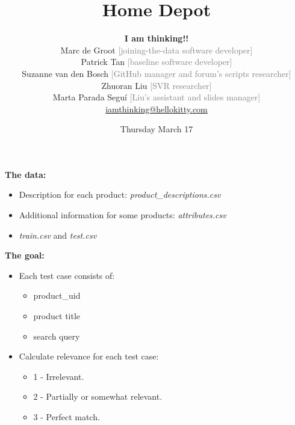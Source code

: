 \documentclass[10pt,handout]{beamer}
\title{Home Depot}
\author[]{\textbf{ \large I am thinking!!}\\ \vspace*{0.25cm} Marc de Groot \textcolor{grey}{\small [joining-the-data software developer]}\\ \vspace*{0.1cm}Patrick Tan \textcolor{grey}{\small[baseline software developer]}\\ \vspace*{0.1cm}Suzanne van den Bosch \textcolor{grey}{\small[GitHub manager and forum's scripts researcher]}\\ \vspace*{0.1cm}Zhuoran Liu \textcolor{grey}{\small[SVR researcher]}\\ \vspace*{0.1cm}Marta Parada Seguí \textcolor{grey}{\small[Liu's assistant and slides manager]}\\ \vspace*{0.65cm} \href{mailto:iamthinking@hellokitty.com}{iamthinking@hellokitty.com}}
\date{Thursday March 17}
\begin{document}
	\renewcommand{\approx}{\simeq}
	\renewcommand{\oplus}{\bigoplus}
	
	\begin{frame}
	 \titlepage
	\end{frame}
	
	\begin{frame}
	 \begin{alertblock}{\textbf{The data:}}
	    \begin{itemize}
	        \item Description for each product: \textit{product\_descriptions.csv} 
	        \item Additional information for some products: \textit{attributes.csv}
	        \item \textit{train.csv} and \textit{test.csv}
	    \end{itemize}
	 \end{alertblock}
	  \begin{alertblock}{\textbf{The goal:}}
	    \begin{itemize}
	        \item Each test case consists of:
	        \begin{itemize}
	        \item product\_uid
	        \item product title
	        \item search query
	        \end{itemize}
	        \item Calculate relevance for each test case:
	        \begin{itemize}
	            \item 1 - Irrelevant.
	            \item 2 - Partially or somewhat relevant.
	            \item 3 - Perfect match.
	        \end{itemize}
	    \end{itemize}
	 \end{alertblock}
	 
	\end{frame}
	
\end{document}
